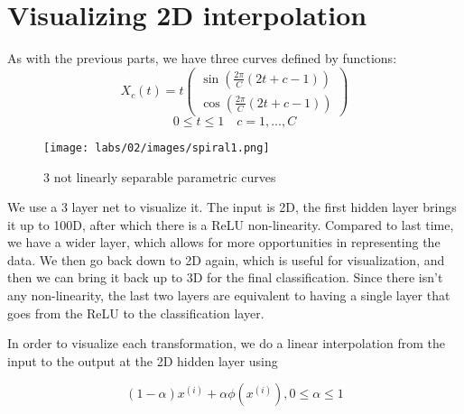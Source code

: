 \chapter{Visualizing 2D interpolation}

As with the previous parts, we have three curves defined by functions:
\[X_c(t) = t
\begin{pmatrix}
    \sin( \frac{2 \pi}{C}(2t + c -1)) \\
    \cos( \frac{2 \pi}{C}(2t + c -1))
\end{pmatrix}
 \]
\[ 0 \leq t \leq 1 \quad c = 1,..., C\]

\begin{figure}[ht]
    \centering
    \texttt{[image: labs/02/images/spiral1.png]}
    \caption{3 not linearly separable parametric curves}
    \label{fig:spiral2}
\end{figure}

We use a 3 layer net to visualize it. The input is 2D, the first hidden layer brings it up to 100D, after which there is a ReLU non-linearity.
Compared to last time, we have a wider layer, which allows for more opportunities in representing the data.
We then go back down to 2D again, which is useful for visualization, and then we can bring it back up to 3D for the final classification.
Since there isn't any non-linearity, the last two layers are equivalent to having a single layer that goes from the ReLU to the classification layer.

In order to visualize each transformation, we do a linear interpolation from the input to the output at the 2D hidden layer using

\[(1-\alpha)x^{(i)} + \alpha \phi(x^{(i)}), 0\le \alpha \le 1
 \]